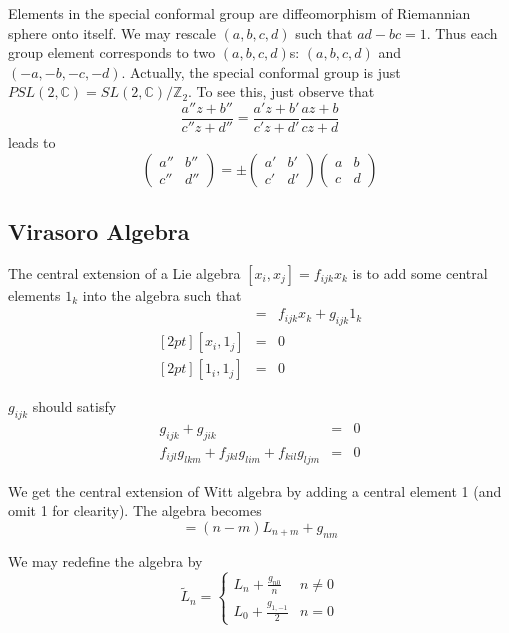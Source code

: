 \documentclass[12pt]{book}
\begin{document}
	Elements in the special conformal group are diffeomorphism of Riemannian sphere onto itself. We may rescale $(a,b,c,d)$ such that $ad-bc=1$. Thus each group element corresponds to two $(a,b,c,d)$s: $(a,b,c,d)$ and $(-a,-b,-c,-d)$. Actually, the special conformal group is just $PSL(2,\mathbb C)=SL(2,\mathbb C)/\mathbb Z_2$. To see this, just observe that
	\begin{equation}
		\frac{a''z+b''}{c''z+d''}=\frac{a'z+b'}{c'z+d'}\frac{az+b}{cz+d}
	\end{equation}
	leads to
	\begin{equation}
		\left(\begin{array}{cc}a''&b''\\c''&d''\end{array}\right)=\pm\left(\begin{array}{cc}a'&b'\\c'&d'\end{array}\right)\left(\begin{array}{cc}a&b\\c&d\end{array}\right)
	\end{equation}
	\subsection{Virasoro Algebra}
	The central extension of a Lie algebra $[x_i,x_j]=f_{ijk}x_k$ is to add some central elements $1_k$ into the algebra such that
	\begin{eqnarray}
		[x_i,x_j]&=&f_{ijk}x_k+g_{ijk}1_k\\
		[2pt][x_i,1_j]&=&0\\
		[2pt][1_i,1_j]&=&0
	\end{eqnarray}
	
	$g_{ijk}$ should satisfy
	\begin{eqnarray}
		g_{ijk}+g_{jik}&=&0\\
		f_{ijl}g_{lkm}+f_{jkl}g_{lim}+f_{kil}g_{ljm}&=&0
	\end{eqnarray}
	
	We get the central extension of Witt algebra by adding a central element 1 (and omit 1 for clearity). The algebra becomes
	\begin{equation}
		[L_n,L_m]=(n-m)L_{n+m}+g_{nm}
	\end{equation}
	
	We may redefine the algebra by 
	\begin{equation}
		\tilde L_n=\left\{\begin{array}{ll}
			L_n+\frac {g_{n0}}n & n\neq0\\
			L_0+\frac {g_{1,-1}}2 & n=0
		\end{array} \right.
	\end{equation}
	
\end{document}
